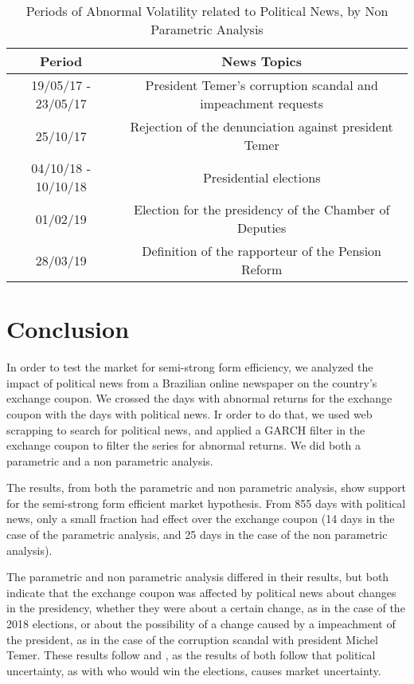 \documentclass[a4paper]{article}
\begin{document}
\begin{table}[H]
\caption{Periods of Abnormal Volatility related to Political News, by Non Parametric Analysis}
\label{tab:resnon}
\centering
\begin{tabular}{| c | c |}
\hline
Period & News Topics \\
\hline \hline
19/05/17 - 23/05/17 & President Temer's corruption scandal and impeachment requests \\
\hline
25/10/17 & Rejection of the denunciation against president Temer \\
\hline
04/10/18 - 10/10/18 & Presidential elections \\
\hline
01/02/19 & Election for the presidency of the Chamber of Deputies \\
\hline
28/03/19 & Definition of the rapporteur of the Pension Reform \\
\hline
\end{tabular}
\end{table}

\section{Conclusion}

In order to test the market for semi-strong form efficiency, we analyzed the impact of political news from a Brazilian online newspaper on the country's exchange coupon. We crossed the days with abnormal returns for the exchange coupon with the days with political news. Ir order to do that, we used web scrapping to search for political news, and applied a GARCH filter in the exchange coupon to filter the series for abnormal returns. We did both a parametric and a non parametric analysis.

The results, from both the parametric and non parametric analysis, show support for the semi-strong form efficient market hypothesis. From 855 days with political news, only a small fraction had effect over the exchange coupon (14 days in the case of the parametric analysis, and 25 days in the case of the non parametric analysis).

The parametric and non parametric analysis differed in their results, but both indicate that the exchange coupon was affected by political news about changes in the presidency, whether they were about a certain change, as in the case of the 2018 elections, or about the possibility of a change caused by a impeachment of the president, as in the case of the corruption scandal with president Michel Temer. These results follow \cite{smales2015} and \cite{marquessantos2016}, as the results of both follow that political uncertainty, as with who would win the elections, causes market uncertainty.
\end{document}
